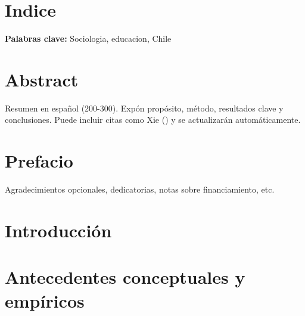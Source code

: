 \documentclass[
  a4paper,
  oneside]{scrbook}
\begin{document}
\frontmatter
\pagestyle{scrheadings}

\setcounter{tocdepth}{2} %
\tableofcontents
\cleardoublepage
\listoffigures
\cleardoublepage
\listoftables
\cleardoublepage


\mainmatter
{}

\chapter{Indice}\label{indice}

\small\textbf{Palabras clave:} Sociologia, educacion, Chile \normalsize


\chapter*{Abstract}\label{abstract}


Resumen en español (200-300). Expón propósito, método, resultados clave
y conclusiones. Puede incluir citas como Xie
() y se actualizarán
automáticamente.


\chapter*{Prefacio}\label{prefacio}


Agradecimientos opcionales, dedicatorias, notas sobre financiamiento,
etc.

\mainmatter


\chapter{Introducción}\label{introducciuxf3n}

\section{}\label{section}


\chapter{Antecedentes conceptuales y
empíricos}\label{antecedentes-conceptuales-y-empuxedricos}
\end{document}

